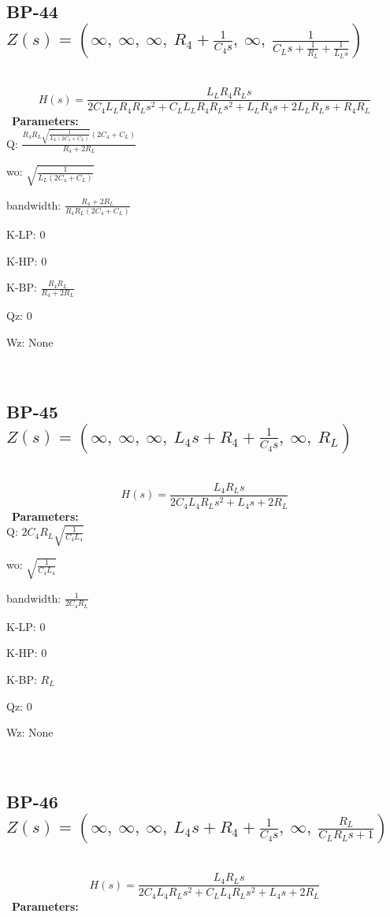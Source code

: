 \documentclass{article}
\begin{document}
\ 

\subsection{BP-44 $Z(s) = \left( \infty, \  \infty, \  \infty, \  R_{4} + \frac{1}{C_{4} s}, \  \infty, \  \frac{1}{C_{L} s + \frac{1}{R_{L}} + \frac{1}{L_{L} s}}\right)$ } \ 
\textbf{\[H(s) = \frac{L_{L} R_{4} R_{L} s}{2 C_{4} L_{L} R_{4} R_{L} s^{2} + C_{L} L_{L} R_{4} R_{L} s^{2} + L_{L} R_{4} s + 2 L_{L} R_{L} s + R_{4} R_{L}}\] } \ 
\textbf{Parameters:}\\ 

Q: $\frac{R_{4} R_{L} \sqrt{\frac{1}{L_{L} \left(2 C_{4} + C_{L}\right)}} \left(2 C_{4} + C_{L}\right)}{R_{4} + 2 R_{L}}$\ 

wo: $\sqrt{\frac{1}{L_{L} \left(2 C_{4} + C_{L}\right)}}$\ 

bandwidth: $\frac{R_{4} + 2 R_{L}}{R_{4} R_{L} \left(2 C_{4} + C_{L}\right)}$\ 

K-LP: $0$\ 

K-HP: $0$\ 

K-BP: $\frac{R_{4} R_{L}}{R_{4} + 2 R_{L}}$\ 

Qz: $0$\ 

Wz: $\text{None}$\ 

\ 

\subsection{BP-45 $Z(s) = \left( \infty, \  \infty, \  \infty, \  L_{4} s + R_{4} + \frac{1}{C_{4} s}, \  \infty, \  R_{L}\right)$ } \ 
\textbf{\[H(s) = \frac{L_{4} R_{L} s}{2 C_{4} L_{4} R_{L} s^{2} + L_{4} s + 2 R_{L}}\] } \ 
\textbf{Parameters:}\\ 

Q: $2 C_{4} R_{L} \sqrt{\frac{1}{C_{4} L_{4}}}$\ 

wo: $\sqrt{\frac{1}{C_{4} L_{4}}}$\ 

bandwidth: $\frac{1}{2 C_{4} R_{L}}$\ 

K-LP: $0$\ 

K-HP: $0$\ 

K-BP: $R_{L}$\ 

Qz: $0$\ 

Wz: $\text{None}$\ 

\ 

\subsection{BP-46 $Z(s) = \left( \infty, \  \infty, \  \infty, \  L_{4} s + R_{4} + \frac{1}{C_{4} s}, \  \infty, \  \frac{R_{L}}{C_{L} R_{L} s + 1}\right)$ } \ 
\textbf{\[H(s) = \frac{L_{4} R_{L} s}{2 C_{4} L_{4} R_{L} s^{2} + C_{L} L_{4} R_{L} s^{2} + L_{4} s + 2 R_{L}}\] } \ 
\textbf{Parameters:}\\ 
\end{document}
